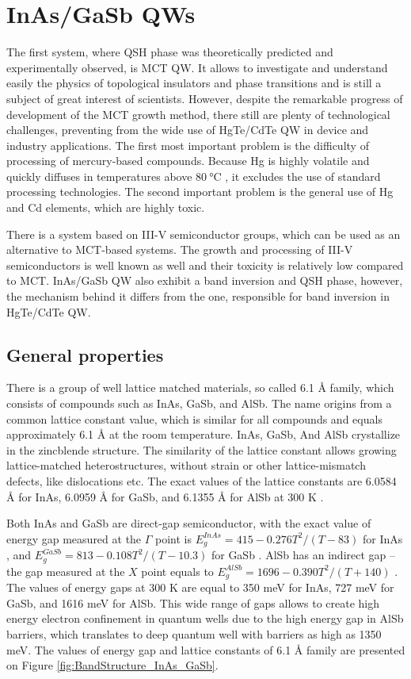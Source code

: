 \documentclass[titlepage,a4paper]{book}
\newcommand{\wciecie}{\quad\phantom{v}}
\begin{document}
\chapter{InAs/GaSb QWs}
\wciecie
The first system, where QSH phase was theoretically predicted and experimentally observed, is MCT QW. It allows to investigate and understand easily the physics of topological insulators and phase transitions and is still a subject of great interest of scientists. However, despite the remarkable progress of development of the MCT growth method, there still are plenty of technological challenges, preventing from the wide use of HgTe/CdTe QW in device and industry applications. The first most important problem is the difficulty of processing of mercury-based compounds. Because Hg is highly volatile and quickly diffuses in temperatures above $\SI{80}{\degreeCelsius}$ \cite{Daumer_MCT_temperature}, it excludes the use of standard processing technologies. The second important problem is the general use of Hg and Cd elements, which are highly toxic.

There is a system based on III-V semiconductor groups, which can be used as an alternative to MCT-based systems. The growth and processing of III-V semiconductors is well known as well and their toxicity is relatively low compared to MCT. InAs/GaSb QW also exhibit a band inversion and QSH phase, however, the mechanism behind it differs from the one, responsible for band inversion in HgTe/CdTe QW.

\section{General properties}
There is a group of well lattice matched materials, so called 6.1 Å family, which consists of compounds such as InAs, GaSb, and AlSb. The name origins from a common lattice constant value, which is similar for all compounds and equals approximately 6.1 Å at the room temperature. InAs, GaSb, And AlSb crystallize in the zincblende structure. The similarity of the lattice constant allows growing lattice-matched heterostructures, without strain or other lattice-mismatch defects, like dislocations etc. The exact values of the lattice constants are 6.0584 Å for InAs, 6.0959 Å for GaSb, and 6.1355 Å for AlSb at 300 K \cite{Sze}.

Both InAs and GaSb are direct-gap semiconductor, with the exact value of energy gap measured at the $\Gamma$ point is $E_g^{InAs} = 415-0.276 T^2/(T-83)$ for InAs \cite{Fang_InAs}, and $E_g^{GaSb} = 813 - 0.108 T^2/(T-10.3)$ for GaSb \cite{Wu_GaSb}. AlSb has an indirect gap – the gap measured at the $X$ point equals to $E_g^{AlSb} = 1696 - 0.390 T^2/(T+140)$ \cite{Vurgaftman_AlSb}. The values of energy gaps at 300 K are equal to 350 meV for InAs, 727 meV for GaSb, and 1616 meV for AlSb. This wide range of gaps allows to create high energy electron confinement in quantum wells due to the high energy gap in AlSb barriers, which translates to deep quantum well with barriers as high as 1350 meV. The values of energy gap and lattice constants of 6.1 Å family are presented on Figure \ref{fig:BandStructure_InAs_GaSb}.
\end{document}
